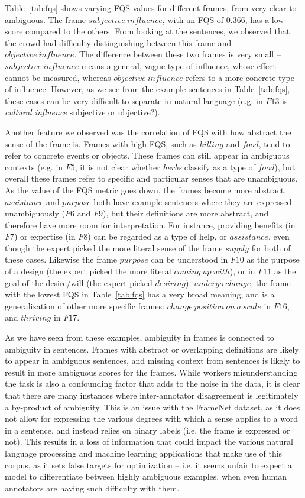 Table~\ref{tab:fqs} shows varying FQS values for different frames, from very clear to ambiguous. The frame $subjective\ influence$, with an FQS of 0.366, has a low score compared to the others. From looking at the sentences, we observed that the crowd had difficulty distinguishing between this frame and $objective\ influence$. The difference between these two frames is very small -- $subjective\ influence$ means a general, vague type of influence, whose effect cannot be measured, whereas $objective\ influence$ refers to a more concrete type of influence. However, as we see from the example sentences in Table~\ref{tab:fqs}, these cases can be very difficult to separate in natural language (e.g. in $F13$ is \textit{cultural influence} subjective or objective?).

Another feature we observed was the correlation of FQS with how abstract the sense of the frame is. Frames with high FQS, such as $killing$ and $food$, tend to refer to concrete events or objects. These frames can still appear in ambiguous contexts (e.g. in $F5$, it is not clear whether \textit{herbs} classify as a type of $food$), but overall these frames refer to specific and particular senses that are unambiguous. As the value of the FQS metric goes down, the frames become more abstract. $assistance$ and $purpose$ both have example sentences where they are expressed unambiguously ($F6$ and $F9$), but their definitions are more abstract, and therefore have more room for interpretation. For instance, providing benefits (in $F7$) or expertise (in $F8$) can be regarded as a type of help, or $assistance$, even though the expert picked the more literal sense of the frame $supply$ for both of these cases. Likewise the frame $purpose$ can be understood in $F10$ as the purpose of a design (the expert picked the more literal $coming\ up\ with$), or in $F11$ as the goal of the desire/will (the expert picked $desiring$). $undergo\ change$, the frame with the lowest FQS in Table~\ref{tab:fqs} has a very broad meaning, and is a generalization of other more specific frames: $change\ position\ on\ a\ scale$ in $F16$, and $thriving$ in $F17$.

As we have seen from these examples, ambiguity in frames is connected to ambiguity in sentences. Frames with abstract or overlapping definitions are likely to appear in ambiguous sentences, and missing context from sentences is likely to result in more ambiguous scores for the frames. While workers misunderstanding the task is also a confounding factor that adds to the noise in the data, it is clear that there are many instances where inter-annotator disagreement is legitimately a by-product of ambiguity. This is an issue with the FrameNet dataset, as it does not allow for expressing the various degrees with which a sense applies to a word in a sentence, and instead relies on binary labels (i.e. the frame is expressed or not). This results in a loss of information that could impact the various natural language processing and machine learning applications that make use of this corpus, as it sets false targets for optimization -- i.e. it seems unfair to expect a model to differentiate between highly ambiguous examples, when even human annotators are having such difficulty with them.

